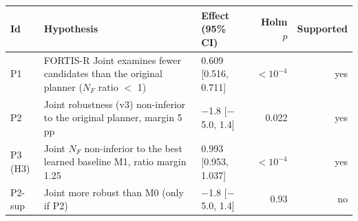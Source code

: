 \begin{tabular}{p{}p{}lrr}
\toprule
Id & Hypothesis & Effect (95\% CI) & Holm $p$ & Supported \\
\midrule
P1 & FORTIS-R Joint examines fewer candidates than the original planner ($N_F$ ratio $<$ 1) & 0.609 [0.516, 0.711] & $<10^{-4}$ & yes \\
P2 & Joint robustness (v3) non-inferior to the original planner, margin 5 pp & $-$1.8 [$-$5.0, 1.4] & 0.022 & yes \\
P3 (H3) & Joint $N_F$ non-inferior to the best learned baseline M1, ratio margin 1.25 & 0.993 [0.953, 1.037] & $<10^{-4}$ & yes \\
P2-sup & Joint more robust than M0 (only if P2) & $-$1.8 [$-$5.0, 1.4] & 0.93 & no \\
\bottomrule
\end{tabular}
